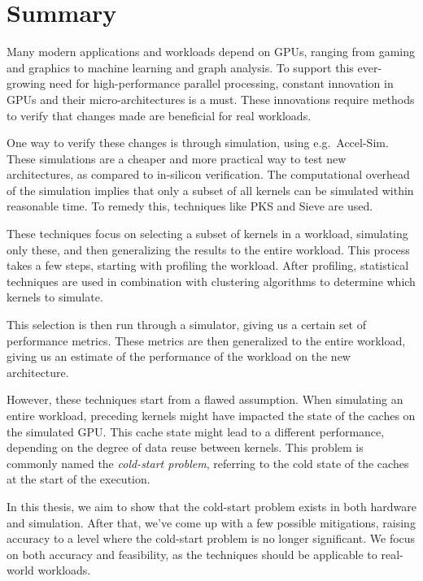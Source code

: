 
\chapter*{Summary}
Many modern applications and workloads depend on GPUs, ranging from gaming and graphics to machine learning and graph analysis.
To support this ever-growing need for high-performance parallel processing, constant innovation in GPUs and their micro-architectures is a must.
These innovations require methods to verify that changes made are beneficial for real workloads.

One way to verify these changes is through simulation, using e.g.\ Accel-Sim.
These simulations are a cheaper and more practical way to test new architectures, as compared to in-silicon verification.
The computational overhead of the simulation implies that only a subset of all kernels can be simulated within reasonable time.
To remedy this, techniques like PKS and Sieve are used.

These techniques focus on selecting a subset of kernels in a workload, simulating only these, and then generalizing the results to the entire workload.
This process takes a few steps, starting with profiling the workload.
After profiling, statistical techniques are used in combination with clustering algorithms to determine which kernels to simulate.

This selection is then run through a simulator, giving us a certain set of performance metrics.
These metrics are then generalized to the entire workload, giving us an estimate of the performance of the workload on the new architecture.

However, these techniques start from a flawed assumption.
When simulating an entire workload, preceding kernels might have impacted the state of the caches on the simulated GPU\@.
This cache state might lead to a different performance, depending on the degree of data reuse between kernels.
This problem is commonly named the \textit{cold-start problem}, referring to the cold state of the caches at the start of the execution.

In this thesis, we aim to show that the cold-start problem exists in both hardware and simulation.
After that, we've come up with a few possible mitigations, raising accuracy to a level where the cold-start problem is no longer significant.
We focus on both accuracy and feasibility, as the techniques should be applicable to real-world workloads.

